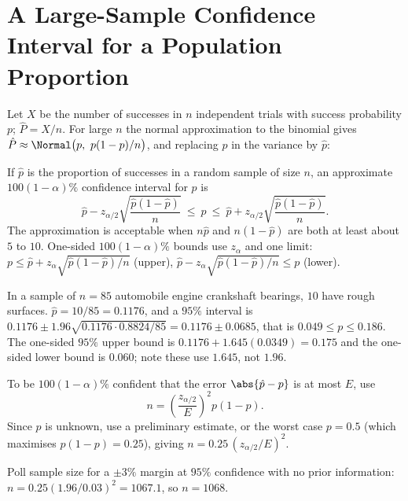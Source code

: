 \section{A Large-Sample Confidence Interval for a Population Proportion}

Let $X$ be the number of successes in $n$ independent trials with success probability $p$; $\hat{P}=X/n$. For large $n$ the normal approximation to the binomial gives $\hat{P}\approx\Normal\big(p,\ p(1-p)/n\big)$, and replacing $p$ in the variance by $\hat{p}$:

\begin{theorem}\label{thm:prop-ci}
If $\hat{p}$ is the proportion of successes in a random sample of size $n$, an approximate $100(1-\alpha)\%$ confidence interval for $p$ is
\[ \hat{p}-z_{\alpha/2}\sqrt{\frac{\hat{p}(1-\hat{p})}n}\ \le\ p\ \le\ \hat{p}+z_{\alpha/2}\sqrt{\frac{\hat{p}(1-\hat{p})}n}. \]
The approximation is acceptable when $n\hat{p}$ and $n(1-\hat{p})$ are both at least about $5$ to $10$. One-sided $100(1-\alpha)\%$ bounds use $z_\alpha$ and one limit: $p\le\hat{p}+z_\alpha\sqrt{\hat{p}(1-\hat{p})/n}$ (upper), $\hat{p}-z_\alpha\sqrt{\hat{p}(1-\hat{p})/n}\le p$ (lower).
\end{theorem}

\begin{example}
In a sample of $n=85$ automobile engine crankshaft bearings, $10$ have rough surfaces. $\hat{p}=10/85=0.1176$, and a $95\%$ interval is $0.1176\pm1.96\sqrt{0.1176\cdot0.8824/85}=0.1176\pm0.0685$, that is $0.049\le p\le0.186$. The one-sided $95\%$ upper bound is $0.1176+1.645(0.0349)=0.175$ and the one-sided lower bound is $0.060$; note these use $1.645$, not $1.96$.
\end{example}

\begin{theorem}\label{thm:samplesize-prop}
To be $100(1-\alpha)\%$ confident that the error $\abs{\hat{p}-p}$ is at most $E$, use
\[ n=\left(\frac{z_{\alpha/2}}E\right)^2p(1-p). \]
Since $p$ is unknown, use a preliminary estimate, or the worst case $p=0.5$ (which maximises $p(1-p)=0.25$), giving $n=0.25\,(z_{\alpha/2}/E)^2$.
\end{theorem}

\begin{example}
Poll sample size for a $\pm3\%$ margin at $95\%$ confidence with no prior information: $n=0.25(1.96/0.03)^2=1067.1$, so $n=1068$.
\end{example}

